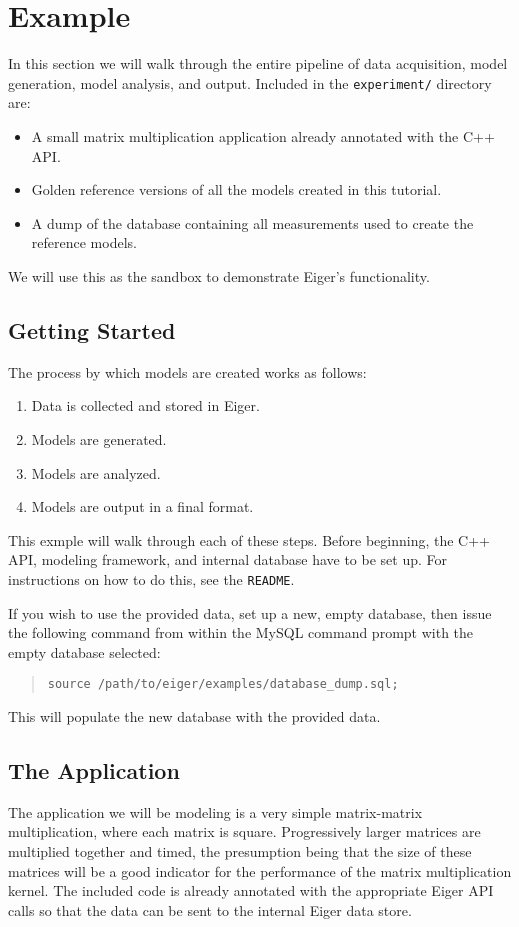 \section{Example}
\label{sec:example}

In this section we will walk through the entire pipeline of data acquisition, model generation, model analysis, and output. Included in the \texttt{experiment/} directory are:
	\begin{itemize}
	\item A small matrix multiplication application already annotated with the C++ API.
	\item Golden reference versions of all the models created in this tutorial.
	\item A dump of the database containing all measurements used to create the reference models.
	\end{itemize}
	We will use this as the sandbox to demonstrate Eiger's functionality.

\subsection{Getting Started}
The process by which models are created works as follows:
	\begin{enumerate}
	\item Data is collected and stored in Eiger.
	\item Models are generated.
	\item Models are analyzed.
	\item Models are output in a final format.
	\end{enumerate}
This exmple will walk through each of these steps. Before beginning, the C++ API, modeling framework, and internal database have to be set up. For instructions on how to do this, see the \texttt{README}.

If you wish to use the provided data, set up a new, empty database, then issue the following command from within the MySQL command prompt with the empty database selected: 
	\begin{quote}
	\texttt{source /path/to/eiger/examples/database\_dump.sql;}
	\end{quote}
This will populate the new database with the provided data.

\subsection{The Application}
The application we will be modeling is a very simple matrix-matrix multiplication, where each matrix is square. Progressively larger matrices are multiplied together and timed, the presumption being that the size of these matrices will be a good indicator for the performance of the matrix multiplication kernel. The included code is already annotated with the appropriate Eiger API calls so that the data can be sent to the internal Eiger data store. 

